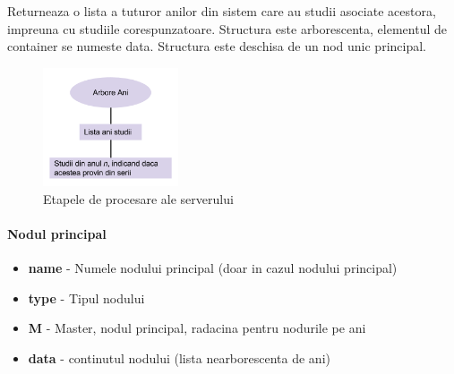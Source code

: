 Returneaza o lista a tuturor anilor din sistem care au studii asociate
acestora, impreuna cu studiile corespunzatoare. Structura este arborescenta,
elementul de container se numeste \textquotedbl{}data\textquotedbl{}.
Structura este deschisa de un nod unic principal.

\begin{figure}[H]
\begin{centering}
\includegraphics[width=4cm]{img/yearstree}
\par\end{centering}
\caption{Etapele de procesare ale serverului}
\end{figure}

\paragraph{Nodul principal}
\begin{itemize}
\item \textbf{name} - Numele nodului principal (doar in cazul nodului principal) 
\item \textbf{type} - Tipul nodului 
\item \textbf{M }- Master, nodul principal, radacina pentru nodurile pe
ani 
\item \textbf{data} - continutul nodului (lista nearborescenta de ani)
\end{itemize}

